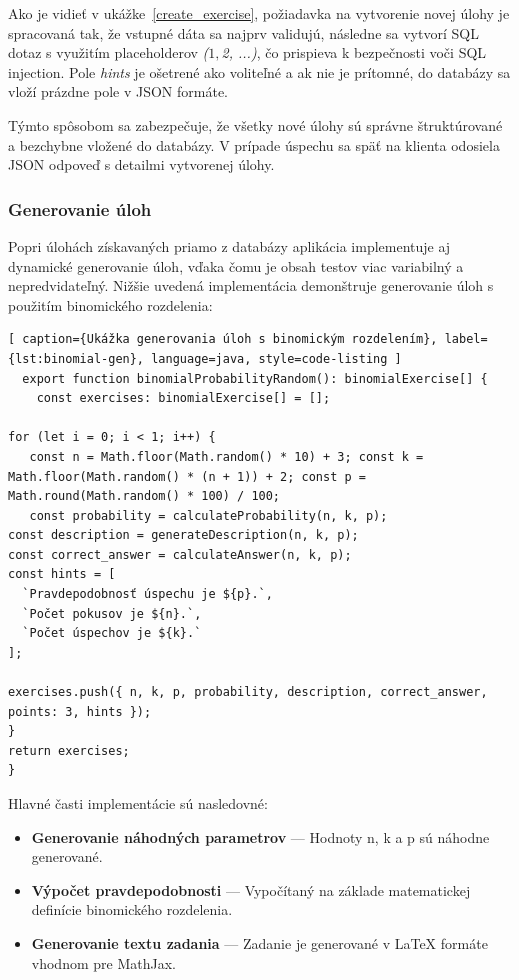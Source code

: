 Ako je vidieť v ukážke~\ref{create_exercise}, požiadavka na vytvorenie novej úlohy je spracovaná tak, že vstupné dáta sa najprv validujú, následne sa vytvorí SQL dotaz s využitím placeholderov \textit{($1, $2, ...)}, čo prispieva k bezpečnosti voči SQL injection.
 Pole \textit{hints} je ošetrené ako voliteľné a ak nie je prítomné, do databázy sa vloží prázdne pole v JSON formáte.

Týmto spôsobom sa zabezpečuje, že všetky nové úlohy sú správne štruktúrované a bezchybne vložené do databázy. 
V prípade úspechu sa späť na klienta odosiela JSON odpoveď s detailmi vytvorenej úlohy.


\subsubsection{Generovanie úloh}
Popri úlohách získavaných priamo z databázy aplikácia implementuje aj dynamické generovanie úloh, vďaka čomu je obsah testov viac variabilný a nepredvidateľný.
Nižšie uvedená implementácia demonštruje generovanie úloh s použitím binomického rozdelenia:

\begin{lstlisting}[ caption={Ukážka generovania úloh s binomickým rozdelením}, label={lst:binomial-gen}, language=java, style=code-listing ] 
  export function binomialProbabilityRandom(): binomialExercise[] { 
    const exercises: binomialExercise[] = [];

for (let i = 0; i < 1; i++) {
   const n = Math.floor(Math.random() * 10) + 3; const k = Math.floor(Math.random() * (n + 1)) + 2; const p = Math.round(Math.random() * 100) / 100;
   const probability = calculateProbability(n, k, p);
const description = generateDescription(n, k, p);
const correct_answer = calculateAnswer(n, k, p);
const hints = [
  `Pravdepodobnosť úspechu je ${p}.`,
  `Počet pokusov je ${n}.`,
  `Počet úspechov je ${k}.`
];

exercises.push({ n, k, p, probability, description, correct_answer, points: 3, hints });
}
return exercises; 
} 

\end{lstlisting}

Hlavné časti implementácie sú nasledovné:

\begin{itemize} \item \textbf{Generovanie náhodných parametrov} — Hodnoty 
n, k a p sú náhodne generované. \item \textbf{Výpočet pravdepodobnosti} — Vypočítaný na základe matematickej definície binomického rozdelenia. 
\item \textbf{Generovanie textu zadania} — Zadanie je generované v LaTeX formáte vhodnom pre MathJax. \end{itemize}

